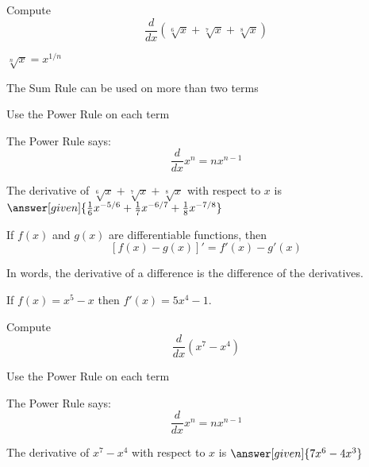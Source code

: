 \documentclass{ximera}
\begin{document}
\begin{problem} %
  Compute 
  \[
  \frac{d}{dx} \left(\sqrt[6] x + \sqrt[7] x + \sqrt[8] x\right)
  \]
  
    \begin{hint}
		 $\sqrt[n] x = x^{1/n}$
		\end{hint}
		\begin{hint}
		  The Sum Rule can be used on more than two terms
		\end{hint}
		\begin{hint}
      Use the Power Rule on each term
    \end{hint}
    \begin{hint}
      The Power Rule says:
      \[
      \frac{d}{dx} x^n = nx^{n-1}
      \]
    \end{hint}    
		The derivative of $\sqrt[6] x + \sqrt[7] x + \sqrt[8] x$ with respect to $x$ is
		 $\answer[given]{\frac16 x^{-5/6} + \frac17 x^{-6/7} + \frac18 x^{-7/8}}$
	
\end{problem}




\begin{theorem} If $f(x)$ and $g(x)$ are differentiable functions, then
\[ [f(x) - g(x)]' =  f'(x) -  g'(x)\]
\end{theorem}

In words, the derivative of a difference is the difference of the derivatives.\\



\begin{example} %
 If $f(x) = x^5 - x$ then $f'(x) = 5x^4 - 1$.
\end{example}

\begin{problem} %
  Compute 
  \[
  \frac{d}{dx} \left(x^7 - x^4\right)
  \]
  
    \begin{hint}
      Use the Power Rule on each term
    \end{hint}
    \begin{hint}
      The Power Rule says:
      \[
      \frac{d}{dx} x^n = nx^{n-1}
      \]
    \end{hint}    
		The derivative of $x^7 - x^4$ with respect to $x$ is
		 $\answer[given]{7x^6 - 4x^3}$
	
\end{problem}
\end{document}
